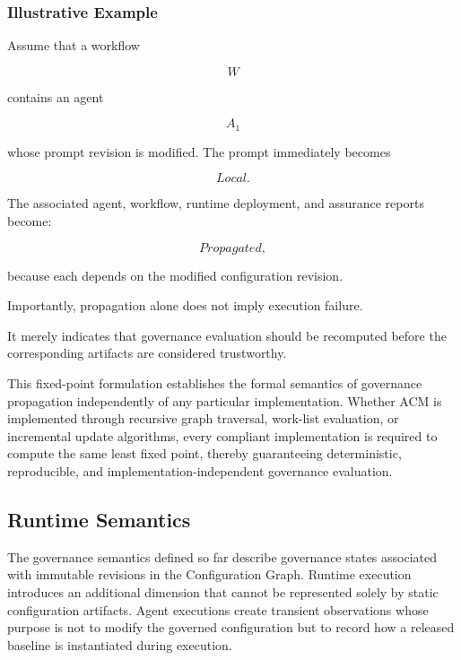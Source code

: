 \documentclass[10pt]{article}
\begin{document}
\subsubsection{Illustrative Example}

Assume that a workflow

\[
W
\]

contains an agent

\[
A_1
\]

whose prompt revision is modified. The prompt immediately becomes

\[
Local.
\]

The associated agent, workflow, runtime deployment, and assurance reports become:

\[
Propagated,
\]

because each depends on the modified configuration revision.

Importantly, propagation alone does not imply execution failure.

It merely indicates that governance evaluation should be recomputed before the corresponding artifacts are considered trustworthy.



This fixed-point formulation establishes the formal semantics of governance
propagation independently of any particular implementation. Whether ACM is implemented through recursive graph traversal, work-list evaluation, or incremental update algorithms, every compliant implementation is required to compute the same least fixed point, thereby guaranteeing deterministic,
reproducible, and implementation-independent governance evaluation.


\subsection{Runtime Semantics}
\label{subsec:runtime_semantics}

The governance semantics defined so far describe governance states associated
with immutable revisions in the Configuration Graph. Runtime execution
introduces an additional dimension that cannot be represented solely by static
configuration artifacts. Agent executions create transient observations whose
purpose is not to modify the governed configuration but to record how a released
baseline is instantiated during execution.
\end{document}
